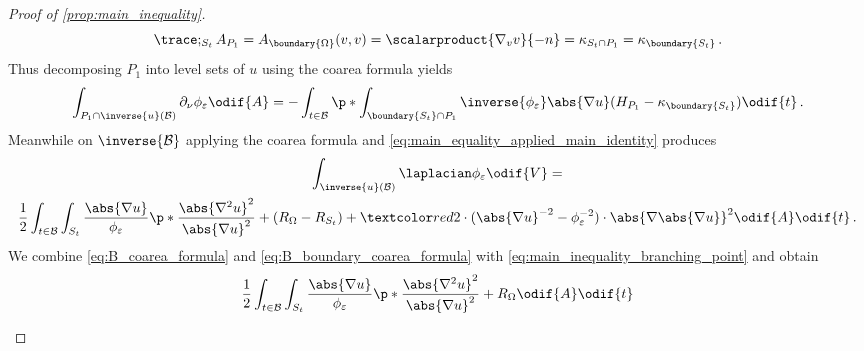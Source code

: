 \documentclass[titlepage,numbers=noenddot,oneside,%
cleardoublepage=empty,paper=a4,fontsize=11pt,%
english,%
]{scrartcl}
\newcommand*{\mathfullstop}{\,.}
\begin{document}
{\begin{proof}[Proof of \cref{prop:main_inequality}]
            \begin{equation*}
                \trace;_{S_t}A_{P_1}=A_{\boundary{\Omega}}(v,v)=\scalarproduct{\nabla_{v}v}{-n}=\kappa_{S_t\cap P_1}=\kappa_{\boundary{S_t}}\mathfullstop
            \end{equation*}
            Thus decomposing \( P_1 \) into level sets of \( u \) using the coarea formula yields 
            \begin{equation}
                \int_{P_1\cap \inverse{u}(\mathcal{B})}\partial_{\nu}\phi_\varepsilon\odif{A}=-\int_{t\in \mathcal{B}}\p*{\int_{\boundary{S_t}\cap P_1}\inverse{\phi_\varepsilon}\abs{\nabla u}(H_{P_1}-\kappa_{\boundary{S_t}})}\odif{t}\mathfullstop\label{eq:B_boundary_coarea_formula}
            \end{equation}
            Meanwhile on \( \inverse{\mathcal{B}} \) applying the coarea formula and \cref{eq:main_equality_applied_main_identity} produces
            \begin{multline}\label{eq:B_coarea_formula}
                \int_{\inverse{u}(\mathcal{B})}\laplacian\phi_\varepsilon\odif{V}=\\ \frac{1}{2}\int_{t\in \mathcal{B}}\int_{S_t}\frac{\abs{\nabla u}}{\phi_{\varepsilon}}\p*{\frac{\abs{\nabla^2 u}^2}{\abs{\nabla u}^2}+(R_{\Omega}-R_{S_t})+\additionalTerms{2\cdot (\abs{\nabla u}^{-2}-\phi_{\varepsilon}^{-2})\cdot\abs{\nabla \abs{\nabla u}}^2}}\odif{A}\odif{t}\mathfullstop
            \end{multline}
            We combine \cref{eq:B_coarea_formula} and \cref{eq:B_boundary_coarea_formula} with \cref{eq:main_inequality_branching_point} and obtain 
            \begin{multline*}
                \begin{aligned}[b]
                       & \frac{1}{2}\int_{t\in \mathcal{B}}\int_{S_t}\frac{\abs{\nabla u}}{\phi_\varepsilon}\p*{\frac{\abs{\nabla^2 u}^2}{\abs{\nabla u}^2}+R_{\Omega}}\odif{A}\odif{t}                                                                                                           \\

\end{aligned}
\end{multline*}
\end{proof}}
\end{document}
